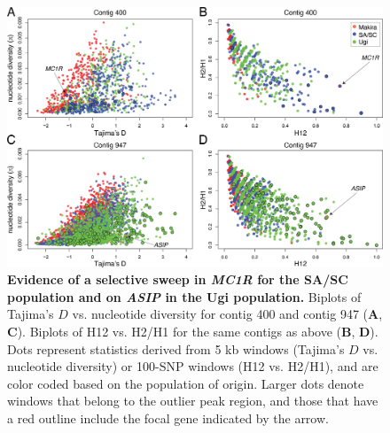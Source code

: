 \begin{figure}[h]
    \centering
    \includegraphics[width=\textwidth]{monarcha_figs/mon_F3.PNG}
    \caption[Evidence of a selective sweep in \textit{MC1R} for the \ac{SA/SC} population and on \textit{ASIP} in the Ugi population.]{\textbf{Evidence of a selective sweep in \textit{MC1R} for the \ac{SA/SC} population and on \textit{ASIP} in the Ugi population.} Biplots of Tajima’s $D$ vs. nucleotide diversity for contig 400 and contig 947 (\textbf{A}, \textbf{C}). Biplots of H12 vs. H2/H1 for the same contigs as above (\textbf{B}, \textbf{D}). Dots represent statistics derived from 5 kb windows (Tajima’s $D$ vs. nucleotide diversity) or 100-\acs{SNP} windows (H12 vs. H2/H1), and are color coded based on the population of origin. Larger dots denote windows that belong to the outlier peak region, and those that have a red outline include the focal gene indicated by the arrow.}
    \label{fig:mon-F3}
\end{figure}

